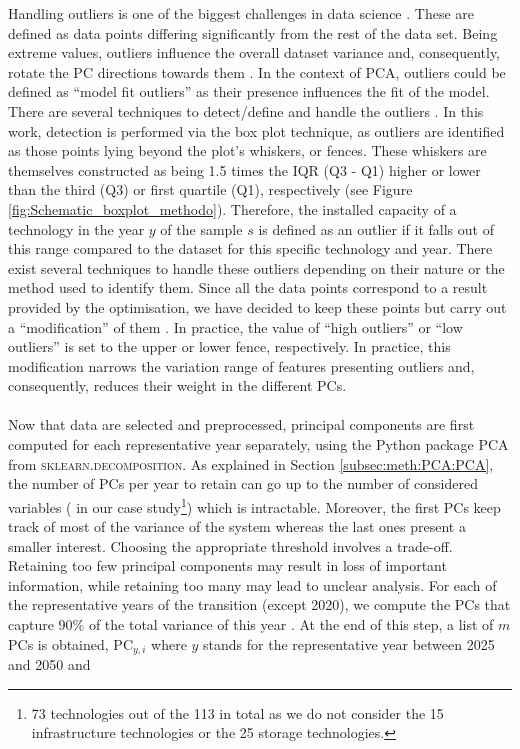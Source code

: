 \noindent
Handling outliers is one of the biggest challenges in data science \cite{aguinis2013best}. These are defined as data points differing significantly from the rest of the data set. Being extreme values, outliers influence the overall dataset variance and, consequently, rotate the PC directions towards them \cite{stanimirova2007dealing}. In the context of \gls{PCA}, outliers could be defined as ``model fit outliers'' as their presence influences the fit of the model. There are several techniques to detect/define and handle the outliers \cite{aguinis2013best}. In this work, detection is performed via the box plot technique, as outliers are identified as those points lying beyond the plot’s whiskers, or fences. These whiskers are themselves constructed as being 1.5 times the \gls{IQR} (Q3 - Q1) higher or lower than the third (Q3) or first quartile (Q1), respectively (see Figure \ref{fig:Schematic_boxplot_methodo}). Therefore, the installed capacity of a technology in the year $y$ of the sample $s$ is defined as an outlier if it falls out of this range compared to the dataset for this specific technology and year. There exist several techniques to handle these outliers depending on their nature or the method used to identify them. Since all the data points correspond to a result provided by the optimisation, we have decided to keep these points but carry out a ``modification'' of them \cite{aguinis2013best}. In practice,  the value of ``high outliers'' or ``low outliers'' is set to the upper or lower fence, respectively. In practice, this modification narrows the variation range of features presenting outliers and, consequently, reduces their weight in the different PCs.\\

\\

\noindent
Now that data are selected and preprocessed, principal components are first computed for each representative year separately, using the Python package \textsc{PCA} from \textsc{sklearn.decomposition}. As explained in Section \ref{subsec:meth:PCA:PCA}, the number of PCs per year to retain can go up to the number of considered variables ( in our case study\footnote{73 technologies out of the 113 in total as we do not consider the 15 infrastructure technologies or the 25 storage technologies.}) which is intractable. Moreover, the first PCs keep track of most of the variance of the system whereas the last ones present a smaller interest. Choosing the appropriate threshold involves a trade-off. Retaining too few principal components may result in loss of important information, while retaining too many may lead to unclear analysis. For each of the representative years of the transition (except 2020), we compute the PCs that capture 90\% of the total variance of this year \cite{jolliffe2002principal}. At the end of this step, a list of $m$ PCs is obtained, \ie $\text{PC}_{y,i}$ where $y$ stands for the representative year between 2025 and 2050 and 

